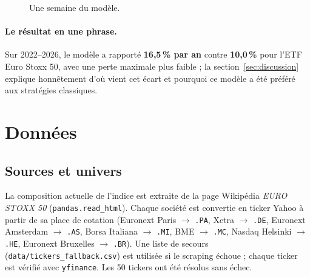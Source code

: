 \documentclass[11pt,a4paper]{article}
\begin{document}
\begin{figure}[H]
\centering
{}
\caption{Une semaine du modèle.}
\label{fig:semaine}
\end{figure}

\paragraph{Le résultat en une phrase.} Sur 2022--2026, le modèle a rapporté \textbf{16,5\,\% par an} contre
\textbf{10,0\,\%} pour l'ETF Euro Stoxx 50, avec une perte maximale plus faible ; la section~\ref{sec:discussion}
explique honnêtement d'où vient cet écart et pourquoi ce modèle a été préféré aux stratégies classiques.

\section{Données}

\subsection{Sources et univers}
La composition actuelle de l'indice est extraite de la page Wikipédia \emph{EURO STOXX 50}
(\texttt{pandas.read\_html}). Chaque société est convertie en ticker Yahoo à partir de sa place de cotation
(Euronext Paris \(\to\) \texttt{.PA}, Xetra \(\to\) \texttt{.DE}, Euronext Amsterdam \(\to\) \texttt{.AS},
Borsa Italiana \(\to\) \texttt{.MI}, BME \(\to\) \texttt{.MC}, Nasdaq Helsinki \(\to\) \texttt{.HE},
Euronext Bruxelles \(\to\) \texttt{.BR}). Une liste de secours (\texttt{data/tickers\_fallback.csv}) est
utilisée si le scraping échoue ; chaque ticker est vérifié avec \texttt{yfinance}. Les 50 tickers ont été
résolus sans échec.
\end{document}
